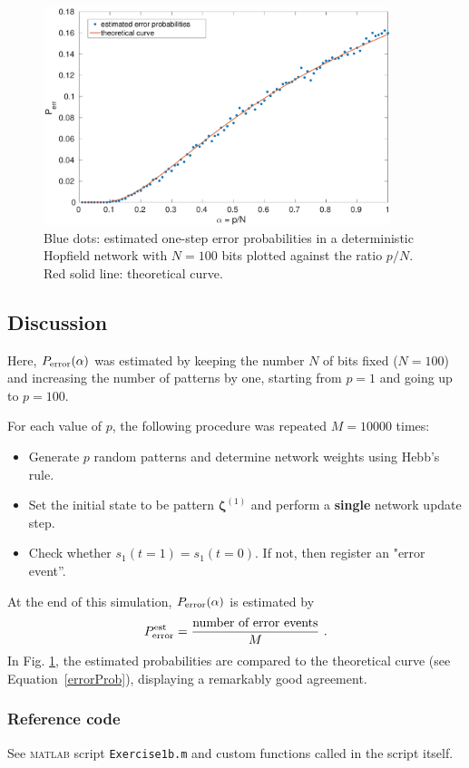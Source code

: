 \documentclass[12pt,A4,titlepage]{article}
\begin{document}
\begin{figure}[H]
\centering
\includegraphics[width=0.9\textwidth]{figures/fig_1b.pdf}
\caption{Blue dots: estimated one-step error probabilities in a deterministic Hopfield network with $N = 100$ bits plotted against the ratio $p/N$. Red solid line: theoretical curve.}
\label{1b}
\end{figure}

\subsection*{Discussion}

Here, $P_{\textup{error}}(\alpha)$ was estimated by keeping the number $N$ of bits fixed ($N = 100$) and increasing the number of patterns by one, starting from $p=1$ and going up to $p = 100$.

For each value of $p$, the following procedure was repeated $M = 10000 $ times:
\begin{itemize}
\itemsep0em 
\item Generate $p$ random patterns and determine network weights using Hebb's rule.
\item Set the initial state to be pattern $\bm{\zeta}^{(1)}$ and perform a \textbf{single} network update step.
\item Check whether $s_1(t=1) = s_1(t=0)$. If not, then register an "error event''.
\end{itemize}
At the end of this simulation, $P_{\textup{error}}(\alpha)$ is estimated by
\[
P_{\textup{error}}^{\textup{est}} = \dfrac{\text{number of error events}}{M} \ .
\]
In Fig. \ref{1b}, the estimated probabilities are compared to the theoretical curve (see Equation~\ref{errorProb}), displaying a remarkably good agreement.

\subsubsection*{Reference code}
See \textsc{matlab} script \texttt{Exercise1b.m} and custom functions called in the script itself.
\clearpage
\end{document}
